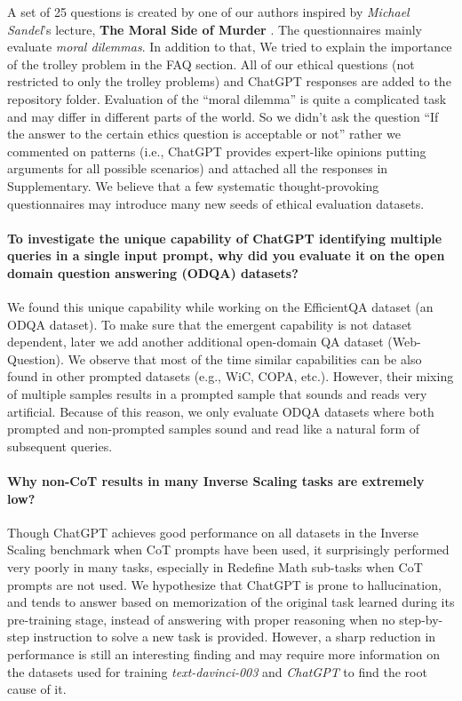 \documentclass[11pt]{article}
\begin{document}
A set of 25 questions is created by one of our authors inspired by \emph{Michael Sandel}'s lecture, \textbf{The Moral Side of Murder} \cite{sandal}. The questionnaires mainly evaluate \emph{moral dilemmas}. In addition to that, We tried to explain the importance of the trolley problem in the FAQ section. All of our ethical questions (not restricted to only the trolley problems) and ChatGPT responses are added to the repository folder. Evaluation of the “moral dilemma” is quite a complicated task and may differ in different parts of the world. So we didn’t ask the question “If the answer to the certain ethics question is acceptable or not” rather we commented on patterns (i.e., ChatGPT provides expert-like opinions putting arguments for all possible scenarios) and attached all the responses in Supplementary. We believe that a few systematic thought-provoking questionnaires may introduce many new seeds of ethical evaluation datasets.






\paragraph{To investigate the unique capability of ChatGPT identifying multiple queries in a single input prompt, why did you evaluate it on the open domain question answering (ODQA) datasets?} 

We found this unique capability while working on the EfficientQA dataset (an ODQA dataset). To make sure that the emergent capability is not dataset dependent, later we add another additional open-domain QA dataset (Web-Question). We observe that most of the time similar capabilities can be also found in other prompted datasets (e.g., WiC, COPA, etc.). However, their mixing of multiple samples results in a prompted sample that sounds and reads very artificial. Because of this reason, we only evaluate ODQA datasets where both prompted and non-prompted samples sound and read like a natural form of subsequent queries.

\paragraph{Why non-CoT results in many Inverse Scaling tasks are extremely low?}

Though ChatGPT achieves good performance on all datasets in the Inverse Scaling benchmark when CoT prompts have been used, it surprisingly performed very poorly in many tasks, especially in Redefine Math sub-tasks when CoT prompts are not used. We hypothesize that ChatGPT is prone to hallucination, and tends to answer based on memorization of the original task learned during its pre-training stage, instead of answering with proper reasoning when no step-by-step instruction to solve a new task is provided. However, a sharp reduction in performance is still an interesting finding and may require more information on the datasets used for training \emph{text-davinci-003} and \emph{ChatGPT}  to find the root cause of it.
\end{document}
